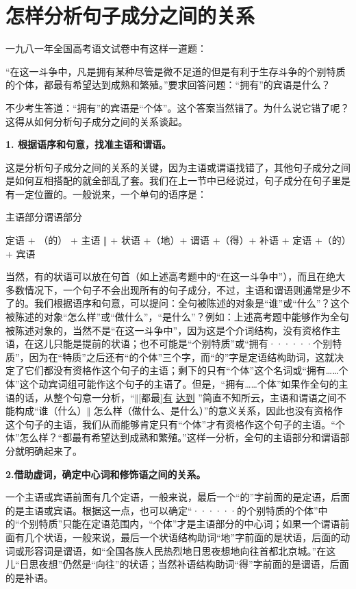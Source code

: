 \section{怎样分析句子成分之间的关系}

一九八一年全国高考语文试卷中有这样一道题：

“在这一斗争中，凡是拥有某种尽管是微不足道的但是有利于生存斗争的个别特质的个体，都最有希望达到成熟和繁殖。”要求回答问题：“拥有”的宾语是什么？

不少考生答道：“拥有”的宾语是“个体”。这个答案当然错了。为什么说它错了呢？这得从如何分析句子成分之间的关系谈起。

\textbf{1. 根据语序和句意，找准主语和谓语。}

这是分析句子成分之间的关系的关键，因为主语或谓语找错了，其他句子成分之间是如何互相搭配的就全部乱了套。我们在上一节中已经说过，句子成分在句子里是有一定位置的。一般说来，一个单句的语序是：

\hspace{4em}主语部分\hspace{6em}谓语部分

定语 + （的） + 主语 $\Vert$ + 状语 +（地）+ 谓语 +（得）+
补语 + 定语 +（的）+ 宾语

当然，有的状语可以放在句首（如上述高考题中的“在这一斗争中”），而且在绝大多数情况下，一个句子不会出现所有的句子成分，不过，主语和谓语则通常是少不了的。我们根据语序和句意，可以提问：全句被陈述的对象是“谁”或“什么”？这个被陈述的对象“怎么样”或“做什么”，“是什么”？例如：上述高考题中能够作为全句被陈述对象的，当然不是“在这一斗争中”，因为这是个介词结构，没有资格作主语，在这儿只能是提前的状语；也不可能是“个别特质”或“拥有······个别特质”，因为在“特质”之后还有“的个体”三个字，而“的”字是定语结构助词，这就决定了它们都没有资格作这个句子的主语；剩下的只有“个体”这个名词或“拥有……个体”这个动宾词组可能作这个句子的主语了。但是，“拥有……个体”如果作全句的主语的话，从整个句意一分析，“$\Vert$[都最]\uline{有}  \uline{达到} ”简直不知所云，主语和谓语之间不能构成“谁（什么）$\Vert$ 怎么样（做什么、是什么）”的意义关系，因此也没有资格作这个句子的主语，我们从而能够肯定只有“个体”才有资格作这个句子的主语。“个体”怎么样？“都最有希望达到成熟和繁殖。”这样一分析，全句的主语部分和谓语部分就明确起来了。

\textbf{2.借助虚词，确定中心词和修饰语之间的关系。}

一个主语或宾语前面有几个定语，一般来说，最后一个“的”字前面的是定语，后面的是主语或宾语。根据这一点，也可以确定“······的个别特质的个体”中的“个别特质”只能在定语范围内，“个体”才是主语部分的中心词；如果一个谓语前面有几个状语，一般来说，最后一个状语结构助词“地”字前面的是状语，后面的动词或形容词是谓语，如“全国各族人民热烈地日思夜想地向往首都北京城。”在这儿“日思夜想”仍然是“向往”的状语；当然补语结构助词“得”字前面的是谓语，后面的是补语。

